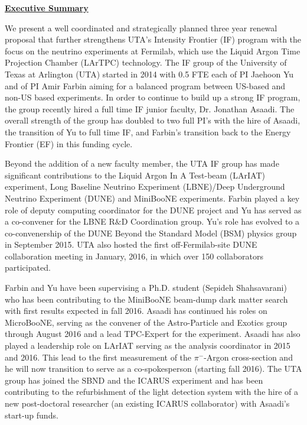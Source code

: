 
\begin{center}
\textbf{\Large\underline{Executive Summary} }
\end{center}

We present a well coordinated and strategically planned three year renewal proposal that further strengthens UTA's Intensity Frontier (IF) program with the focus on the neutrino experiments at Fermilab, which use the Liquid Argon Time Projection Chamber (LArTPC) technology. The IF group of the University of Texas at Arlington (UTA) started in 2014 with 0.5 FTE each of PI Jaehoon Yu and of PI Amir Farbin aiming for a balanced program between US-based and non-US based experiments. In order to continue to build up a strong IF program, the group recently hired a full time IF junior faculty, Dr. Jonathan Asaadi. The overall strength of the group has doubled to two full PI's with the hire of Asaadi, the transition of Yu to full time IF, and Farbin's transition back to the Energy Frontier (EF) in this funding cycle.

Beyond the addition of a new faculty member, the UTA IF group has made significant contributions to the Liquid Argon In A Test-beam (LArIAT) experiment, Long Baseline Neutrino Experiment (LBNE)/Deep Underground Neutrino Experiment (DUNE) and MiniBooNE experiments. Farbin played a key role of deputy computing coordinator for the DUNE project and Yu has served as a co-convener for the LBNE R$\&$D Coordination group. Yu's role has evolved to a co-convenership of the DUNE Beyond the Standard Model (BSM) physics group in September 2015. UTA also hosted the first off-Fermilab-site DUNE collaboration meeting in January, 2016, in which over 150 collaborators participated. 

Farbin and Yu have been supervising a Ph.D. student (Sepideh Shahsavarani) who has been contributing to the MiniBooNE beam-dump dark matter search with first results expected in fall 2016. Asaadi has continued his roles on MicroBooNE, serving as the convener of the Astro-Particle and Exotics group through August 2016 and a lead TPC-Expert for the experiment. Asaadi has also played a leadership role on LArIAT serving as the analysis coordinator in 2015 and 2016. This lead to the first measurement of the $\pi^{-}$-Argon cross-section and he will now transition to serve as a co-spokesperson (starting fall 2016). The UTA group has joined the SBND and the ICARUS experiment and has been contributing to the refurbishment of the light detection system with the hire of a new post-doctoral researcher (an existing ICARUS collaborator) with Asaadi's start-up funds.

